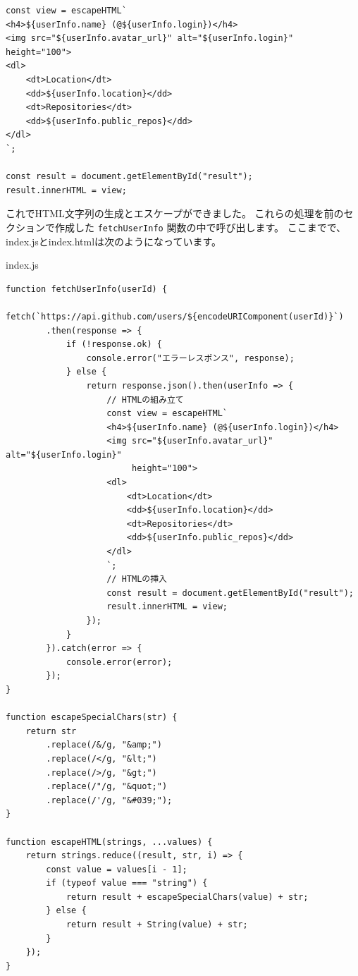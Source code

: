 \begin{lstlisting}
const view = escapeHTML`
<h4>${userInfo.name} (@${userInfo.login})</h4>
<img src="${userInfo.avatar_url}" alt="${userInfo.login}" height="100">
<dl>
    <dt>Location</dt>
    <dd>${userInfo.location}</dd>
    <dt>Repositories</dt>
    <dd>${userInfo.public_repos}</dd>
</dl>
`;

const result = document.getElementById("result");
result.innerHTML = view;
\end{lstlisting}

これでHTML文字列の生成とエスケープができました。
これらの処理を前のセクションで作成した
\texttt{fetchUserInfo} 関数の中で呼び出します。
ここまでで、index.jsとindex.htmlは次のようになっています。

\begin{listtitle}
index.js
\end{listtitle}
\begin{lstlisting}
function fetchUserInfo(userId) {
    fetch(`https://api.github.com/users/${encodeURIComponent(userId)}`)
        .then(response => {
            if (!response.ok) {
                console.error("エラーレスポンス", response);
            } else {
                return response.json().then(userInfo => {
                    // HTMLの組み立て
                    const view = escapeHTML`
                    <h4>${userInfo.name} (@${userInfo.login})</h4>
                    <img src="${userInfo.avatar_url}" alt="${userInfo.login}" 
                         height="100">
                    <dl>
                        <dt>Location</dt>
                        <dd>${userInfo.location}</dd>
                        <dt>Repositories</dt>
                        <dd>${userInfo.public_repos}</dd>
                    </dl>
                    `;
                    // HTMLの挿入
                    const result = document.getElementById("result");
                    result.innerHTML = view;
                });
            }
        }).catch(error => {
            console.error(error);
        });
}

function escapeSpecialChars(str) {
    return str
        .replace(/&/g, "&amp;")
        .replace(/</g, "&lt;")
        .replace(/>/g, "&gt;")
        .replace(/"/g, "&quot;")
        .replace(/'/g, "&#039;");
}

function escapeHTML(strings, ...values) {
    return strings.reduce((result, str, i) => {
        const value = values[i - 1];
        if (typeof value === "string") {
            return result + escapeSpecialChars(value) + str;
        } else {
            return result + String(value) + str;
        }
    });
}
\end{lstlisting}
\listend

